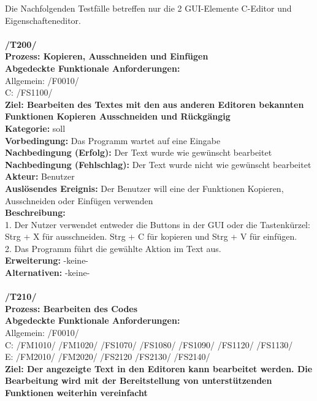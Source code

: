 \documentclass[a4paper]{scrreprt}
\begin{document}
Die Nachfolgenden Testfälle betreffen nur die 2 GUI-Elemente C-Editor und Eigenschafteneditor. \\\\
\textbf{/T200/} \\
\textbf{Prozess: Kopieren, Ausschneiden und Einfügen} \\
\textbf{Abgedeckte Funktionale Anforderungen:}\\
Allgemein: /F0010/ \\
C: /FS1100/ \\
\textbf{Ziel: Bearbeiten des Textes mit den aus anderen Editoren bekannten Funktionen Kopieren Ausschneiden und Rückgängig} \\
\textbf{Kategorie:} soll\\
\textbf{Vorbedingung:} Das Programm wartet auf eine Eingabe\\
\textbf{Nachbedingung (Erfolg):} Der Text wurde wie gewünscht bearbeitet\\
\textbf{Nachbedingung (Fehlschlag):} Der Text wurde nicht wie gewünscht bearbeitet\\
\textbf{Akteur:} Benutzer \\
\textbf{Auslösendes Ereignis:} Der Benutzer will eine der Funktionen Kopieren, Ausschneiden oder Einfügen verwenden\\
\textbf{Beschreibung:} \\
1. Der Nutzer verwendet entweder die Buttons in der GUI oder die Tastenkürzel:\\
Strg + X für ausschneiden. Strg + C für kopieren und Strg + V für einfügen. \\
2. Das Programm führt die gewählte Aktion im Text aus.\\
\textbf {Erweiterung:} -keine- \\
\textbf {Alternativen:} -keine- \\\\
\textbf{/T210/} \\
\textbf{Prozess: Bearbeiten des Codes} \\
\textbf{Abgedeckte Funktionale Anforderungen:}\\
Allgemein: /F0010/  \\
C: /FM1010/ /FM1020/ /FS1070/ /FS1080/ /FS1090/ /FS1120/ /FS1130/   \\
E: /FM2010/ /FM2020/ /FS2120 /FS2130/ /FS2140/ \\
\textbf{Ziel: Der angezeigte Text in den Editoren kann bearbeitet werden. Die Bearbeitung wird mit der Bereitstellung von unterstützenden Funktionen weiterhin vereinfacht} \\
\end{document}
